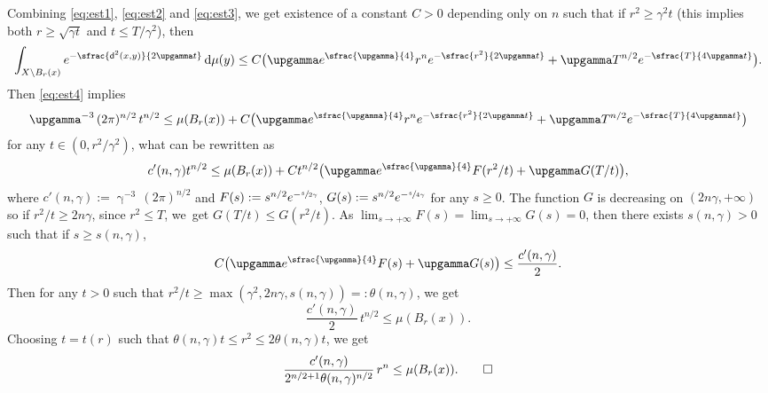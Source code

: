 \documentclass[10pt]{amsart}
\theoremstyle{plain}
\theoremstyle{definition}
\newcommand{\di}{\mathop{}\!\mathrm{d}}
\newcommand{\dist}{\mathsf{d}}
\begin{document}
Combining \eqref{eq:est1}, \eqref{eq:est2} and \eqref{eq:est3}, we get existence of a constant $C>0$ depending only on $n$ such that if
$r^2 \ge \gamma^2 t$ (this implies both $r\ge \sqrt{\gamma t}$ and $t \le T/\gamma^2$), then
\[
\int_{X\setminus B_r(x)} e^{-\sfrac{\dist^2(x,y)}{2\upgamma t}}\di\mu(y)\le C\bigl(\upgamma e^{\sfrac{\upgamma}{4}}r^n e^{-\sfrac{r^2}{2\upgamma t}}+\upgamma T^{n/2} e^{-\sfrac{T}{4\upgamma t}}\bigr).
\]
Then \eqref{eq:est4} implies
\begin{equation}\label{eq:lem}
\upgamma^{-3}\,(2\pi)^{n/2}\, t^{n/2} \le \mu(B_r(x))+C\bigl(\upgamma e^{\sfrac{\upgamma}{4}}r^n e^{-\sfrac{r^2}{2\upgamma t}}+\upgamma T^{n/2} e^{-\sfrac{T}{4\upgamma t}}\bigr)
\end{equation}
for any $t \in (0,r^2/\gamma^2)$, what can be rewritten as
\[
c'(n,\gamma)t^{n/2}\le \mu(B_r(x))+Ct^{n/2}\bigl(\upgamma e^{\sfrac{\upgamma}{4}} F(r^2/t)+\upgamma G(T/t)\bigr),
\]
where $c'(n,\gamma):=\upgamma^{-3}\,(2\pi)^{n/2}$ and $F(s):=s^{n/2}e^{-\sfrac{s}{2\gamma}}$, $G(s):=s^{n/2}e^{-\sfrac{s}{4\gamma}}$ for any $s\ge 0$. The function $G$ is decreasing on $(2 n\gamma,+\infty)$ so if $r^2/t \ge 2 n\gamma$, since $r^2 \le T$, we~get $G(T/t) \le G(r^2/t)$. As $\lim_{s \to +\infty}F(s)=\lim_{s \to +\infty} G(s)=0$, then there exists $s(n,\gamma)>0$ such that if $s\ge s(n,\gamma)$,
\[
C\bigl(\upgamma e^{\sfrac{\upgamma}{4}} F(s)+\upgamma G(s)\bigr) \le \frac{c'(n,\gamma)}{2}.
\]
Then for any $t >0$ such that $r^2/t \ge \max(\gamma^2,2 n\gamma,s(n,\gamma))=:\theta(n,\gamma)$, we get
\[
\frac{c'(n,\gamma)}{2}\,t^{n/2} \le \mu(B_r(x)).
\]
Choosing $t=t(r)$ such that $\theta(n,\gamma) t \le r^2 \le 2 \theta(n,\gamma)t$, we get
\[
\frac{c'(n,\gamma)}{2^{n/2+1}\theta(n,\gamma)^{n/2}}\, r^{n} \le \mu(B_r(x)).\qedhere
\]
\endproof
\end{document}

